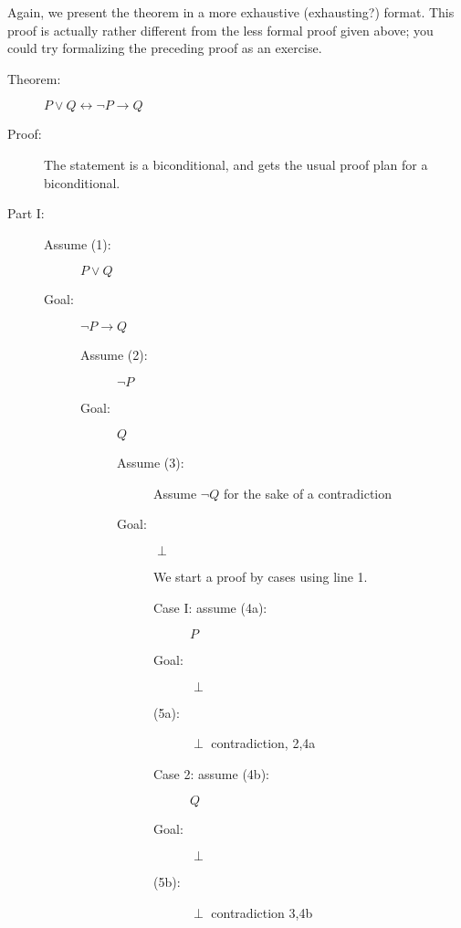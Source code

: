 \documentclass[12pt]{book}
\begin{document}
\newpage

Again, we present the theorem in a more exhaustive (exhausting?) format.  This proof is actually rather different from the less formal proof given above; you could try formalizing the preceding proof as an exercise.

\begin{description}

\item[Theorem:]  $P \vee Q \leftrightarrow \neg P \rightarrow Q$

\item[Proof:]  The statement is a biconditional, and gets the usual proof plan for a biconditional.

\item[Part I:]

\begin{description}

\item[Assume (1):]  $P \vee Q$

\item[Goal:]  $\neg P \rightarrow Q$

\begin{description}

\item[Assume (2):]  $\neg P$

\item[Goal:] $Q$

\begin{description}

\item[Assume (3):]  Assume $\neg Q$ for the sake of a contradiction

\item [Goal:]  $\perp$

We start a proof by cases using line 1.

\begin{description}

\item[Case I:  assume (4a):]  $P$

\item[Goal:] $\perp$

\item[(5a):]  $\perp$ contradiction, 2,4a

\item[Case 2:  assume (4b):] $Q$

\item[Goal:]  $\perp$

\item[(5b):]  $\perp$ contradiction 3,4b


\end{description}
\end{description}
\end{description}
\end{description}
\end{description}
\end{document}
